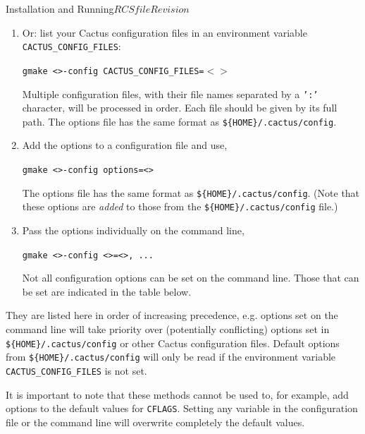 \begin{cactuspart}{Installation and Running}{$RCSfile$}{$Revision$}
\begin{enumerate}
    \texttt{<> [=] ...}

    The equals sign is optional. Spaces are allowed everywhere.
    Text starting wit a \texttt{'\#'} character will be ignored as a comment.

  \item[2b]{}
    Or: list your Cactus configuration files in an environment variable
    \texttt{CACTUS\_CONFIG\_FILES}:

    \texttt{gmake <>-config
                  CACTUS\_CONFIG\_FILES=$<$$>$}

    Multiple configuration files, with their file names separated by a
    \texttt{':'} character, will be processed in order.
    Each file should be given by its full path.
    The options file has the same format as \texttt{\$\{HOME\}/.cactus/config}.

  \item[3]{}
    Add the options to a configuration file and use,

    \texttt{gmake <>-config  options=<>}

    The options file has the same format as \texttt{\$\{HOME\}/.cactus/config}.
    (Note that these options are \emph{added} to those from the
    \texttt{\$\{HOME\}/.cactus/config} file.)

  \item[4]{}
    Pass the options individually on the command line,

    \texttt{gmake <>-config
                           <>=<>, ...}

    Not all configuration options can be set on the command line.
    Those that can be set are indicated in the table below.
\end{enumerate}

They are listed here in order of increasing precedence, e.g. options
set on the command line will take priority over (potentially
conflicting) options set in \texttt{\$\{HOME\}/.cactus/config} or other
Cactus configuration files. Default options from
\texttt{\$\{HOME\}/.cactus/config} will only be read if the
environment variable \texttt{CACTUS\_CONFIG\_FILES} is not set.

It is important to note that these methods cannot be used to, for example, add
options to the default values for \texttt{CFLAGS}.  Setting any variable in the
configuration file or the command line will overwrite completely the
default values.


\end{cactuspart}
